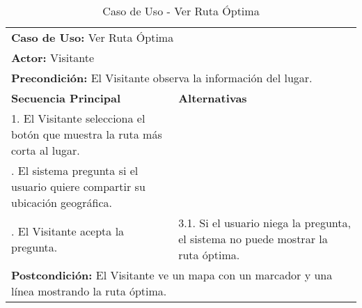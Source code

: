 \begin{table}[H]
  \begin{center}
    \begin{tabularx}{0.75\textwidth}{ X X  }
      \toprule
      \multicolumn{2}{l}{\textbf{Caso de Uso:} Ver Ruta Óptima} \\
      \multicolumn{2}{l}{\textbf{Actor:} Visitante} \\
      \multicolumn{2}{l}{\textbf{Precondición:} El Visitante observa la información del lugar.} \\
      \addlinespace
      \textbf{Secuencia Principal} & \textbf{Alternativas} \\
      \midrule
      1. El Visitante selecciona el botón que muestra la ruta más corta al lugar. & \\
      \addlinespace
      2. El sistema pregunta si el usuario quiere compartir su ubicación geográfica. & \\
      \addlinespace
      3. El Visitante acepta la pregunta. &
      3.1. Si el usuario niega la pregunta, el sistema no puede mostrar la ruta óptima. \\

      \midrule
      \multicolumn{2}{L{11cm}}{\textbf{Postcondición:} El Visitante ve un mapa con un marcador y una línea mostrando la ruta óptima. } \\

      \bottomrule
    \end{tabularx}
    \caption{Caso de Uso - Ver Ruta Óptima}
    \label{tab:cu_ruta_optima}
  \end{center}
\end{table}




